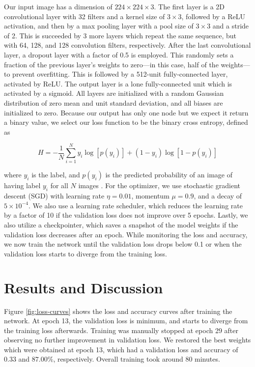 \documentclass[12pt,a4paper]{article}
\begin{document}
Our input image has a dimension of $224 \times 224 \times 3$. The first layer is a 2D convolutional layer with 32 filters and a kernel size of $3 \times 3$, followed by a ReLU activation, and then by a max pooling layer with a pool size of $3 \times 3$ and a stride of 2. This is succeeded by 3 more layers which repeat the same sequence, but with 64, 128, and 128 convolution filters, respectively. After the last convolutional layer, a dropout layer with a factor of 0.5 is employed. This randomly sets a fraction of the previous layer's weights to zero---in this case, half of the weights---to prevent overfitting. This is followed by a 512-unit fully-connected layer, activated by ReLU. The output layer is a lone fully-connected unit which is activated by a sigmoid. All layers are initialized with a random Gaussian distribution of zero mean and unit standard deviation, and all biases are initialized to zero. Because our output has only one node but we expect it return a binary value, we select our loss function to be the binary cross entropy, defined as

\begin{equation}\label{eq:loss}
	H = -\frac{1}{N} \sum_{i=1}^N y_i \log[p(y_i)] + (1 - y_i) \log[1 - p(y_i)]
\end{equation}

\noindent where $y_i$ is the label, and $p(y_i)$ is the predicted probability of an image of having label $y_i$ for all $N$ images \cite{godoy}. For the optimizer, we use stochastic gradient descent (SGD) with learning rate $\eta = 0.01$, momentum $\mu = 0.9$, and a decay of $5 \times 10^{-4}$. We also use a learning rate scheduler, which reduces the learning rate by a factor of 10 if the validation loss does not improve over 5 epochs. Lastly, we also utilize a checkpointer, which saves a snapshot of the model weights if the validation loss decreases after an epoch. While monitoring the loss and accuracy, we now train the network until the validation loss drops below 0.1 or when the validation loss starts to diverge from the training loss.

\section{Results and Discussion}
Figure \ref{fig:loss-curves} shows the loss and accuracy curves after training the network. At epoch 13, the validation loss is minimum, and starts to diverge from the training loss afterwards. Training was manually stopped at epoch 29 after observing no further improvement in validation loss. We restored the best weights which were obtained at epoch 13, which had a validation loss and accuracy of $0.33$ and $87.00\%$, respectively. Overall training took around 80 minutes.
\end{document}
